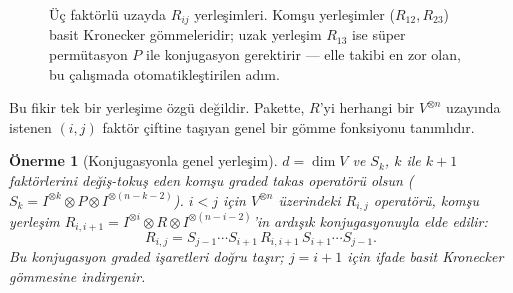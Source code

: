 \documentclass[12pt,a4paper,fleqn]{report}
\newcommand{\normalsemi}{;}
\newcommand{\normalsemi}{\begingroup\semicolonfont;\endgroup}
\numberwithin{equation}{chapter}
\theoremstyle{plain}
\newtheorem{proposition}[theorem]{Önerme}
\theoremstyle{definition}
\begin{document}
\begin{figure}[h]
\centering
{}
\caption{Üç faktörlü uzayda $R_{ij}$ yerleşimleri. Komşu yerleşimler ($R_{12},R_{23}$)
basit Kronecker gömmeleridir\normalsemi{} uzak yerleşim $R_{13}$ ise süper permütasyon $P$
ile konjugasyon gerektirir --- elle takibi en zor olan, bu çalışmada
otomatikleştirilen adım.}
\label{fig:place}
\end{figure}

Bu fikir tek bir yerleşime özgü değildir. Pakette, $R$'yi herhangi bir
$V^{\otimes n}$ uzayında istenen $(i,j)$ faktör çiftine taşıyan genel bir gömme
fonksiyonu tanımlıdır.

\begin{proposition}[Konjugasyonla genel yerleşim]\label{prop:embed}
$d=\dim V$ ve $S_k$, $k$ ile $k{+}1$ faktörlerini değiş-tokuş eden komşu graded
takas operatörü olsun ($S_k=I^{\otimes k}\otimes P\otimes I^{\otimes(n-k-2)}$).
$i<j$ için $V^{\otimes n}$ üzerindeki $R_{i,j}$ operatörü, komşu yerleşim
$R_{i,i+1}=I^{\otimes i}\otimes R\otimes I^{\otimes(n-i-2)}$'in ardışık
konjugasyonuyla elde edilir:
\begin{equation}
R_{i,j}=S_{j-1}\cdots S_{i+1}\,R_{i,i+1}\,S_{i+1}\cdots S_{j-1}.
\end{equation}
Bu konjugasyon graded işaretleri doğru taşır\normalsemi{} $j=i+1$ için ifade basit Kronecker
gömmesine indirgenir.
\end{proposition}
\end{document}
